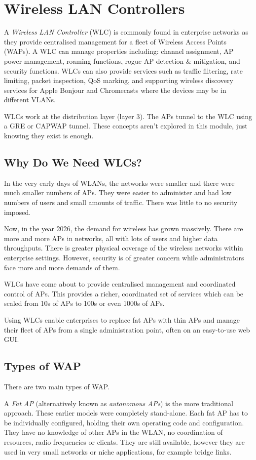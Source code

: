 \section{Wireless LAN Controllers}
A \textit{Wireless LAN Controller} (WLC) is commonly found in enterprise networks as they provide centralised management for a fleet of Wireless Access Points (WAPs). A WLC can manage properties including: channel assignment, AP power management, roaming functions, rogue AP detection \& mitigation, and security functions. WLCs can also provide services such as traffic filtering, rate limiting, packet inspection, QoS marking, and supporting wireless discovery services for Apple Bonjour and Chromecasts where the devices may be in different VLANs. 

WLCs work at the distribution layer (layer 3). The APs tunnel to the WLC using a GRE or CAPWAP tunnel. These concepts aren't explored in this module, just knowing they exist is enough.

\subsection{Why Do We Need WLCs?}
In the very early days of WLANs, the networks were smaller and there were much smaller numbers of APs. They were easier to administer and had low numbers of users and small amounts of traffic. There was little to no security imposed.

Now, in the year 2026, the demand for wireless has grown massively. There are more and more APs in networks, all with lots of users and higher data throughputs. There is greater physical coverage of the wireless networks within enterprise settings. However, security is of greater concern while administrators face more and more demands of them.

WLCs have come about to provide centralised management and coordinated control of APs. This provides a richer, coordinated set of services which can be scaled from 10s of APs to 100s or even 1000s of APs. 

Using WLCs enable enterprises to replace fat APs with thin APs and manage their fleet of APs from a single administration point, often on an easy-to-use web GUI. 

\subsection{Types of WAP}
There are two main types of WAP. 

A \textit{Fat AP} (alternatively known as \textit{autonomous APs}) is the more traditional approach. These earlier models were completely stand-alone. Each fat AP has to be individually configured, holding their own operating code and configuration. They have no knowledge of other APs in the WLAN, no coordination of resources, radio frequencies or clients. They are still available, however they are used in very small networks or niche applications, for example bridge links.

